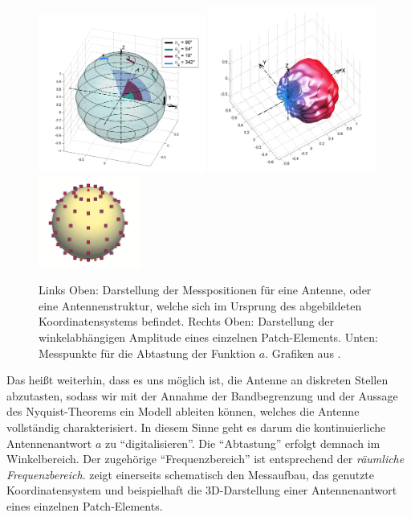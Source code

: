 \begin{figure}[t]
    \centering\includegraphics[width=0.49\textwidth]{img/eadf/measure.png}
    \includegraphics[width=0.49\textwidth]{img/eadf/3d_bp.png}
    \includegraphics[width=0.3\textwidth]{img/eadf/bp_sampling.png}
    \caption{Links Oben: Darstellung der Messpositionen f\"ur eine Antenne, oder eine Antennenstruktur, welche sich im Ursprung des abgebildeten Koordinatensystems befindet. Rechts Oben: Darstellung der winkelabh\"angigen Amplitude eines einzelnen Patch-Elements. Unten: Messpunkte f\"ur die Abtastung der Funktion $a$. Grafiken aus \cite{landmann2004EADF,delgaldo2007phd}.}\label{eadf_meas}
\end{figure}

Das hei{\ss}t weiterhin, dass es uns m\"oglich ist, die Antenne an diskreten Stellen abzutasten, sodass wir mit der Annahme der Bandbegrenzung und der Aussage des Nyquist-Theorems ein Modell ableiten k\"onnen, welches die Antenne vollst\"andig charakterisiert.
In diesem Sinne geht es darum die kontinuierliche Antennenantwort $a$ zu ``digitalisieren''.
Die ``Abtastung'' erfolgt demnach im Winkelbereich. Der zugeh\"orige ``Frequenzbereich'' ist entsprechend der \emph{r\"aumliche Frequenzbereich}.
 zeigt einerseits schematisch den Messaufbau, das genutzte Koordinatensystem und beispielhaft die 3D-Darstellung einer Antennenantwort eines einzelnen Patch-Elements.

